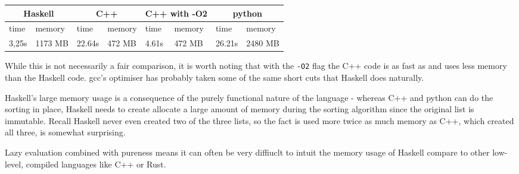 \documentclass[a4paper,10pt]{article}
\begin{document}
\vspace{10pt}

\begin{tabular}{ |p{1.5cm}|p{1.5cm}||p{1.5cm}|p{1.5cm}||p{1.5cm}|p{1.5cm}||p{1.5cm}|p{1.5cm}|  }
 \hline
 \multicolumn{2}{|c|}{Haskell} &
 \multicolumn{2}{|c|}{C++} &
 \multicolumn{2}{|c|}{C++ with -O2} &
 \multicolumn{2}{|c|}{python}\\
 \hline
 time & memory & time & memory & time & memory & time & memory\\
 \hline
 3,25s & 1173 MB & 22.64s & 472 MB & 4.61s & 472 MB & 26.21s & 2480 MB \\
 \hline
\end{tabular}

\vspace{10pt}

While this is not necessarily a fair comparison, it is worth noting that with the \texttt{-O2} flag the C++ code is as fast as and uses less memory than the Haskell code. gcc's optimiser has probably taken some of the same short cuts that Haskell does naturally.

Haskell's large memory usage is a consequence of the purely functional nature of the language - whereas C++ and python can do the sorting in place, Haskell needs to create allocate a large amount of memory during the sorting algorithm since the original list is immutable. Recall Haskell never even created two of the three lists, so the fact is used more twice as much memory as C++, which created all three, is somewhat surprising.

Lazy evaluation combined with pureness means it can often be very diffiuclt to intuit the memory usage of Haskell compare to other low-level, compiled languages like C++ or Rust.
\end{document}
